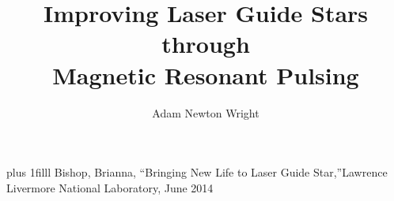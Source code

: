 \documentclass{beamer}
\title{Improving Laser Guide Stars through \\Magnetic Resonant Pulsing}
\author{Adam Newton Wright}
\institute{Willamette University}
\newcommand{\btVFill}{\vskip0pt plus 1filll}
\begin{document}
{
	\begin{frame}
	  \color{white}
	  \titlepage
	  \bigskip
	  \btVFill
	  {\tiny{Bishop, Brianna, ``Bringing New Life to Laser Guide Star,''Lawrence Livermore National Laboratory, June 2014}}

	\end{frame}
 } 





\end{document}
